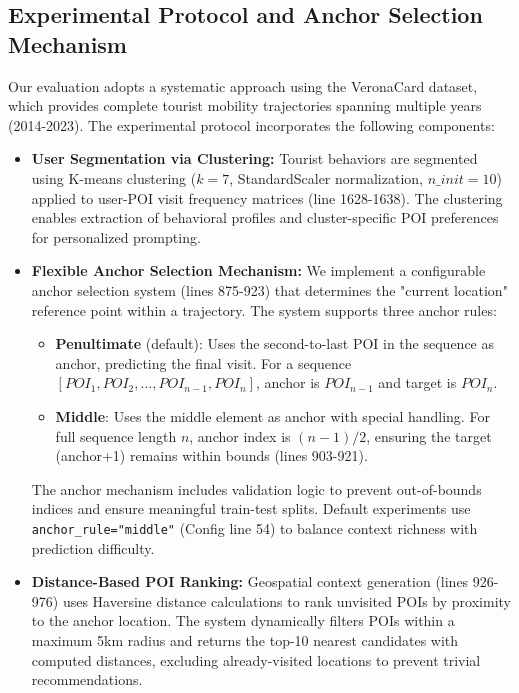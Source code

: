 \documentclass{article}
\begin{document}
\subsection{Experimental Protocol and Anchor Selection Mechanism}

Our evaluation adopts a systematic approach using the VeronaCard dataset, which provides complete tourist mobility trajectories spanning multiple years (2014-2023). The experimental protocol incorporates the following components:

\begin{itemize}
    \item \textbf{User Segmentation via Clustering:} Tourist behaviors are segmented using K-means clustering ($k=7$, StandardScaler normalization, $n\_init=10$) applied to user-POI visit frequency matrices (line 1628-1638). The clustering enables extraction of behavioral profiles and cluster-specific POI preferences for personalized prompting.

    \item \textbf{Flexible Anchor Selection Mechanism:} We implement a configurable anchor selection system (lines 875-923) that determines the "current location" reference point within a trajectory. The system supports three anchor rules:
    \begin{itemize}
        \item \textbf{Penultimate} (default): Uses the second-to-last POI in the sequence as anchor, predicting the final visit. For a sequence $[POI_1, POI_2, ..., POI_{n-1}, POI_n]$, anchor is $POI_{n-1}$ and target is $POI_n$.
        \item \textbf{Middle}: Uses the middle element as anchor with special handling. For full sequence length $n$, anchor index is $(n-1)/2$, ensuring the target (anchor+1) remains within bounds (lines 903-921).
    \end{itemize}

    The anchor mechanism includes validation logic to prevent out-of-bounds indices and ensure meaningful train-test splits. Default experiments use \texttt{anchor\_rule="middle"} (Config line 54) to balance context richness with prediction difficulty.

    \item \textbf{Distance-Based POI Ranking:} Geospatial context generation (lines 926-976) uses Haversine distance calculations to rank unvisited POIs by proximity to the anchor location. The system dynamically filters POIs within a maximum 5km radius and returns the top-10 nearest candidates with computed distances, excluding already-visited locations to prevent trivial recommendations.


\end{itemize}
\end{document}
